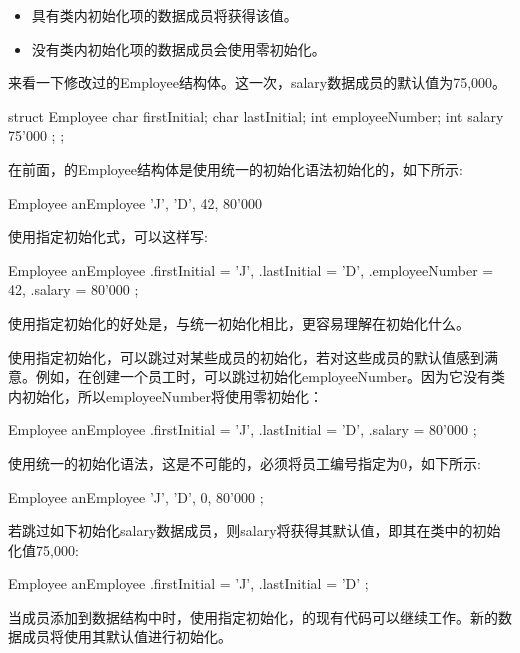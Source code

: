 \begin{itemize}
\item
具有类内初始化项的数据成员将获得该值。

\item
没有类内初始化项的数据成员会使用零初始化。
\end{itemize}

来看一下修改过的Employee结构体。这一次，salary数据成员的默认值为75,000。

\begin{cpp}
struct Employee {
    char firstInitial;
    char lastInitial;
    int employeeNumber;
    int salary { 75'000 };
};
\end{cpp}

在前面，的Employee结构体是使用统一的初始化语法初始化的，如下所示:

\begin{cpp}
Employee anEmployee { 'J', 'D', 42, 80'000 }
\end{cpp}

使用指定初始化式，可以这样写:

\begin{cpp}
Employee anEmployee {
    .firstInitial = 'J',
    .lastInitial = 'D',
    .employeeNumber = 42,
    .salary = 80'000
};
\end{cpp}

使用指定初始化的好处是，与统一初始化相比，更容易理解在初始化什么。

使用指定初始化，可以跳过对某些成员的初始化，若对这些成员的默认值感到满意。例如，在创建一个员工时，可以跳过初始化employeeNumber。因为它没有类内初始化，所以employeeNumber将使用零初始化：

\begin{cpp}
Employee anEmployee {
    .firstInitial = 'J',
    .lastInitial = 'D',
    .salary = 80'000
};
\end{cpp}

使用统一的初始化语法，这是不可能的，必须将员工编号指定为0，如下所示:

\begin{cpp}
Employee anEmployee { 'J', 'D', 0, 80'000 };
\end{cpp}

若跳过如下初始化salary数据成员，则salary将获得其默认值，即其在类中的初始化值75,000:

\begin{cpp}
Employee anEmployee {
    .firstInitial = 'J',
    .lastInitial = 'D'
};
\end{cpp}

当成员添加到数据结构中时，使用指定初始化，的现有代码可以继续工作。新的数据成员将使用其默认值进行初始化。


